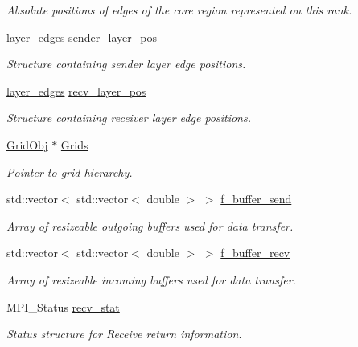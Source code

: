 \begin{DoxyCompactItemize}
\begin{DoxyCompactList}\small\item\em Absolute positions of edges of the core region represented on this rank. \end{DoxyCompactList}\item 
\hyperlink{struct_mpi_manager_1_1layer__edges}{layer\+\_\+edges} \hyperlink{class_mpi_manager_a0cb9f8f024ec0a186374995fb203ea1e}{sender\+\_\+layer\+\_\+pos}
\begin{DoxyCompactList}\small\item\em Structure containing sender layer edge positions. \end{DoxyCompactList}\item 
\hyperlink{struct_mpi_manager_1_1layer__edges}{layer\+\_\+edges} \hyperlink{class_mpi_manager_ad1ff57a97ec56efc1690dd3a5a52fd64}{recv\+\_\+layer\+\_\+pos}
\begin{DoxyCompactList}\small\item\em Structure containing receiver layer edge positions. \end{DoxyCompactList}\item 
\hyperlink{class_grid_obj}{Grid\+Obj} $\ast$ \hyperlink{class_mpi_manager_ad5ce72a2047a4cbb38f76d71c96571d8}{Grids}
\begin{DoxyCompactList}\small\item\em Pointer to grid hierarchy. \end{DoxyCompactList}\item 
std\+::vector$<$ std\+::vector$<$ double $>$ $>$ \hyperlink{class_mpi_manager_aafbb74832f69a915927b9bf252bd971d}{f\+\_\+buffer\+\_\+send}
\begin{DoxyCompactList}\small\item\em Array of resizeable outgoing buffers used for data transfer. \end{DoxyCompactList}\item 
std\+::vector$<$ std\+::vector$<$ double $>$ $>$ \hyperlink{class_mpi_manager_ab8f1eeab50fd4812b3a51af1a6c43713}{f\+\_\+buffer\+\_\+recv}
\begin{DoxyCompactList}\small\item\em Array of resizeable incoming buffers used for data transfer. \end{DoxyCompactList}\item 
M\+P\+I\+\_\+\+Status \hyperlink{class_mpi_manager_a257bc27e8099f1cbf5ac70b80d8eadaa}{recv\+\_\+stat}
\begin{DoxyCompactList}\small\item\em Status structure for Receive return information. \end{DoxyCompactList}\item 

\end{DoxyCompactItemize}
